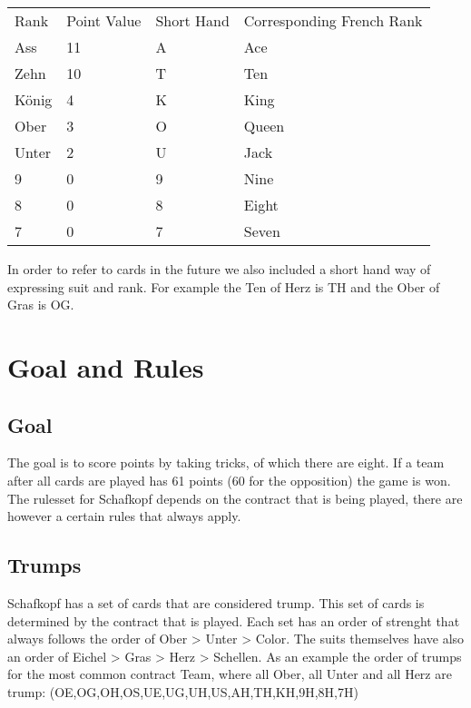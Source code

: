\begin{table}[]
    \begin{tabular}{llll}
        Rank  & Point Value & Short Hand & Corresponding French Rank \\
        Ass   & 11          & A          & Ace                       \\
        Zehn  & 10          & T          & Ten                       \\
        König & 4           & K          & King                      \\
        Ober  & 3           & O          & Queen                     \\
        Unter & 2           & U          & Jack                      \\
        9     & 0           & 9          & Nine                      \\
        8     & 0           & 8          & Eight                     \\
        7     & 0           & 7          & Seven
    \end{tabular}\label{tab:table}
\end{table}
In order to refer to cards in the future we also included a short hand way of expressing suit and rank.
For example the Ten of Herz is TH and the Ober of Gras is OG.


\section{Goal and Rules}

\subsection{Goal}
The goal is to score points by taking tricks, of which there are eight.
If a team after all cards are played has 61 points (60 for the opposition) the game is won.
The rulesset for Schafkopf depends on the contract that is being played, there are however a certain rules that
always apply.

\subsection{Trumps}
Schafkopf has a set of cards that are considered trump.
This set of cards is determined by the contract that is played.
Each set has an order of strenght that always follows the order of Ober > Unter > Color.
The suits themselves have also an order of Eichel > Gras > Herz > Schellen.
As an example the order of trumps for the most common contract Team, where all Ober, all Unter and all Herz are trump:
(OE,OG,OH,OS,UE,UG,UH,US,AH,TH,KH,9H,8H,7H)

